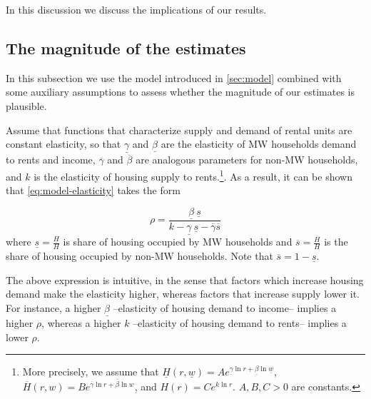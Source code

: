 
In this discussion we discuss the implications of our results.

\subsection{The magnitude of the estimates}\label{sec:benchmark}

In this subsection we use the model introduced in \autoref{sec:model} combined with some auxiliary 
assumptions to assess whether the magnitude of our estimates is plausible.

Assume that functions that characterize supply and demand of rental units are constant elasticity, 
so that $\underline{\gamma}$ and $\underline{\beta}$ are the elasticity of MW households demand to 
rents and income, $\overline{\gamma}$ and $\overline{\beta}$ are analogous parameters for non-MW 
households, and $k$ is the elasticity of housing supply to rents.\footnote{More precisely, we 
	assume that $\underline{H}(r, \underline{w}) = A e^{\underline{\gamma} \ln r + \underline{\beta} 
		\ln\underline{w}}$, $\overline{H}(r, w) = B e^{\overline{\gamma} \ln r + \overline{\beta} \ln 
		w}$, and $H(r) = C e^{k \ln r}$. $A, B, C > 0$ are constants.}. 
As a result, it can be shown that \autoref{eq:model-elasticity} takes the form

\begin{equation}\label{eq:benchmarking-elasticity}
\rho = \frac{\underline{\beta} \ \underline{s}}
{k - \underline{\gamma} \ \underline{s} 
	- \overline{\gamma} \overline{s}}
\end{equation}
where $\underline{s} = \frac{\underline{H}}{H}$ is share of housing occupied by MW households 
and $\overline{s} = \frac{\overline{H}}{H}$ is the share of housing occupied by non-MW households. 
Note that $\overline{s} = 1 - \underline{s}$.

The above expression is intuitive, in the sense that factors which increase housing demand make 
the elasticity higher, whereas factors that increase supply lower it. For instance, a higher 
$\underline{\beta}$ --elasticity of housing demand to income-- implies a higher $\rho$, whereas 
a higher $k$ --elasticity of housing demand to rents-- implies a lower $\rho$.

